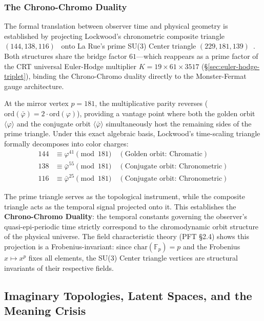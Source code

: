\subsubsection{The Chrono-Chromo Duality}

The formal translation between observer time and physical geometry is established by projecting Lockwood's chronometric composite triangle $(144, 138, 116)$~\cite{lockwood_chrono} onto La Rue's prime SU(3) Center triangle $(229, 181, 139)$~\cite{larue_chromatic}. Both structures share the bridge factor $61$---which reappears as a prime factor of the CRT universal Euler-Hodge multiplier $K = 19 \times 61 \times 3517$ (\S\ref{sec:euler-hodge-triplet}), binding the Chrono-Chromo duality directly to the Monster-Fermat gauge architecture. 

At the mirror vertex $p = 181$, the multiplicative parity reverses ($\mathrm{ord}(\bar{\varphi}) = 2 \cdot \mathrm{ord}(\varphi)$), providing a vantage point where both the golden orbit $\langle \varphi \rangle$ and the conjugate orbit $\langle \bar{\varphi} \rangle$ simultaneously host the remaining sides of the prime triangle. Under this exact algebraic basis, Lockwood's time-scaling triangle formally decomposes into color charges:
\begin{align*}
144 &\equiv \varphi^{41} \pmod{181} \quad (\text{Golden orbit: Chromatic}) \\
138 &\equiv \bar{\varphi}^{55} \pmod{181} \quad (\text{Conjugate orbit: Chronometric}) \\
116 &\equiv \bar{\varphi}^{25} \pmod{181} \quad (\text{Conjugate orbit: Chronometric})
\end{align*}

The prime triangle serves as the topological instrument, while the composite triangle acts as the temporal signal projected onto it. This establishes the \textbf{Chrono-Chromo Duality}: the temporal constants governing the observer's quasi-epi-periodic time strictly correspond to the chromodynamic orbit structure of the physical universe. The field characteristic theory (PFT \S2.4) shows this projection is a Frobenius-invariant: since $\mathrm{char}(\mathbb{F}_p) = p$ and the Frobenius $x \mapsto x^p$ fixes all elements, the SU(3) Center triangle vertices are structural invariants of their respective fields.

\subsection{Imaginary Topologies, Latent Spaces, and the Meaning Crisis}

